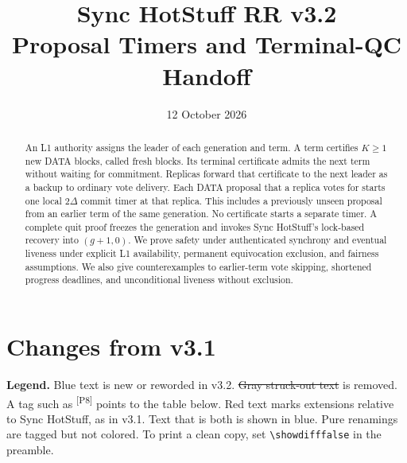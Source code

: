 \documentclass[11pt,a4paper]{article}
\title{Sync HotStuff RR v3.2\\\large Proposal Timers and Terminal-QC Handoff}
\author{}\date{12 October 2026}
\newcommand{\RR}[1]{{\color{rrRed}#1}}
\newif\ifshowdiff
\newcommand{\NEW}[1]{{\color{diffNew}#1}}
\newcommand{\DEL}[1]{{\color{diffDel}\sout{#1}}}
\newcommand{\NEW}[1]{#1}
\newcommand{\DEL}[1]{}
\begin{document}
\maketitle
\begin{abstract}
An L1 authority assigns the leader of each generation and term.
A term certifies $K\ge1$ \NEW{new DATA blocks, called fresh blocks}. Its
terminal certificate admits the next term without waiting for commitment.
Replicas forward that certificate to the next leader as a backup to
ordinary vote delivery. \NEW{Each DATA proposal that a replica votes for
starts one local $2\Delta$ commit timer at that replica}. This includes a
previously unseen proposal from an earlier term of the same generation.
No certificate starts a separate timer. A complete quit proof freezes the
generation and invokes Sync HotStuff's lock-based recovery into $(g+1,0)$.
We prove safety under authenticated synchrony and eventual liveness under
explicit L1 availability, permanent equivocation exclusion, and fairness
assumptions. We also give counterexamples to earlier-term vote skipping,
shortened progress deadlines, and unconditional liveness without exclusion.
\end{abstract}

\ifshowdiff
\section*{Changes from v3.1}
\label{sec:changes}
\textbf{Legend.} {\color{diffNew}Blue text} is new or reworded in v3.2.
\DEL{Gray struck-out text} is removed. A tag such as
\textsuperscript{\color{diffNew}\sffamily\scriptsize[P8]} points to the
table below. \RR{Red text} marks extensions relative to Sync HotStuff, as
in v3.1. Text that is both is shown in blue. Pure renamings are tagged but
not colored. To print a clean copy, set \verb|\showdifffalse| in the
preamble.
\end{document}
